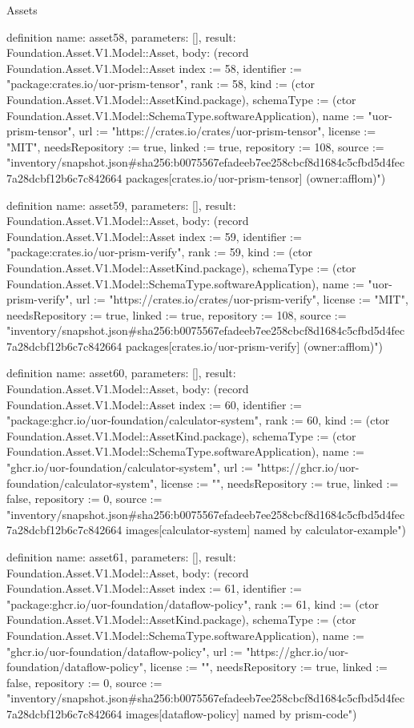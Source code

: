 \begin{lexlean}{Assets}
\begin{semanticmodule}
definition{
  name: asset58,
  parameters: [],
  result: Foundation.Asset.V1.Model::Asset,
  body: (record Foundation.Asset.V1.Model::Asset {index := 58, identifier := "package:crates.io/uor-prism-tensor", rank := 58, kind := (ctor Foundation.Asset.V1.Model::AssetKind.package), schemaType := (ctor Foundation.Asset.V1.Model::SchemaType.softwareApplication), name := "uor-prism-tensor", url := "https://crates.io/crates/uor-prism-tensor", license := "MIT", needsRepository := true, linked := true, repository := 108, source := "inventory/snapshot.json#sha256:b0075567efadeeb7ee258cbcf8d1684c5cfbd5d4fec7a28dcbf12b6c7c842664 packages[crates.io/uor-prism-tensor] (owner:afflom)"})
}

definition{
  name: asset59,
  parameters: [],
  result: Foundation.Asset.V1.Model::Asset,
  body: (record Foundation.Asset.V1.Model::Asset {index := 59, identifier := "package:crates.io/uor-prism-verify", rank := 59, kind := (ctor Foundation.Asset.V1.Model::AssetKind.package), schemaType := (ctor Foundation.Asset.V1.Model::SchemaType.softwareApplication), name := "uor-prism-verify", url := "https://crates.io/crates/uor-prism-verify", license := "MIT", needsRepository := true, linked := true, repository := 108, source := "inventory/snapshot.json#sha256:b0075567efadeeb7ee258cbcf8d1684c5cfbd5d4fec7a28dcbf12b6c7c842664 packages[crates.io/uor-prism-verify] (owner:afflom)"})
}

definition{
  name: asset60,
  parameters: [],
  result: Foundation.Asset.V1.Model::Asset,
  body: (record Foundation.Asset.V1.Model::Asset {index := 60, identifier := "package:ghcr.io/uor-foundation/calculator-system", rank := 60, kind := (ctor Foundation.Asset.V1.Model::AssetKind.package), schemaType := (ctor Foundation.Asset.V1.Model::SchemaType.softwareApplication), name := "ghcr.io/uor-foundation/calculator-system", url := "https://ghcr.io/uor-foundation/calculator-system", license := "", needsRepository := true, linked := false, repository := 0, source := "inventory/snapshot.json#sha256:b0075567efadeeb7ee258cbcf8d1684c5cfbd5d4fec7a28dcbf12b6c7c842664 images[calculator-system] named by calculator-example"})
}

definition{
  name: asset61,
  parameters: [],
  result: Foundation.Asset.V1.Model::Asset,
  body: (record Foundation.Asset.V1.Model::Asset {index := 61, identifier := "package:ghcr.io/uor-foundation/dataflow-policy", rank := 61, kind := (ctor Foundation.Asset.V1.Model::AssetKind.package), schemaType := (ctor Foundation.Asset.V1.Model::SchemaType.softwareApplication), name := "ghcr.io/uor-foundation/dataflow-policy", url := "https://ghcr.io/uor-foundation/dataflow-policy", license := "", needsRepository := true, linked := false, repository := 0, source := "inventory/snapshot.json#sha256:b0075567efadeeb7ee258cbcf8d1684c5cfbd5d4fec7a28dcbf12b6c7c842664 images[dataflow-policy] named by prism-code"})
}


\end{semanticmodule}
\end{lexlean}
